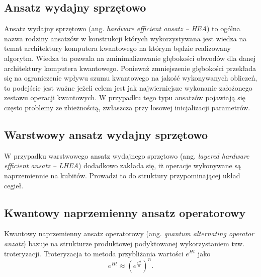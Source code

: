 \documentclass[a4paper,11pt]{article}
\newcommand{\ang}[1]{(ang. \emph{#1})}
\begin{document}
\subsection{Ansatz wydajny sprzętowo}

Ansatz wydajny sprzętowo \ang{hardware efficient ansatz -- HEA} to ogólna nazwa rodziny ansatzów w konstrukcji których wykorzystywana jest wiedza na temat architektury komputera kwantowego na którym będzie realizowany algorytm. Wiedza ta pozwala na zminimalizowanie głębokości obwodów dla danej architektury komputera kwantowego. Ponieważ zmniejszenie głębokości przekłada się na ograniczenie wpływu szumu kwantowego na jakość wykonywanych obliczeń, to podejście jest ważne jeżeli celem jest jak najwierniejsze wykonanie założonego zestawu operacji kwantowych. W przypadku tego typu ansatzów pojawiają się często problemy ze zbieżnością, zwłaszcza przy losowej inicjalizacji parametrów.

\subsection{Warstwowy ansatz wydajny sprzętowo}

W przypadku warstwowego ansatz wydajnego sprzętowo \ang{layered hardware efficient ansatz -- LHEA} dodadkowo zakłada się, iż operacje wykonywane są naprzemiennie na kubitów. Prowadzi to do struktury przypominającej układ cegieł.  

\subsection{Kwantowy naprzemienny ansatz operatorowy}

Kwantowy naprzemienny ansatz operatorowy \ang{quantum alternating operator anzatz} bazuje na strukturze produktowej podyktowanej wykorzystaniem tzw. troteryzacji. Troteryzacja to metoda przybliżania wartości $e^{Ht}$ jako
\begin{equation}
	e^{Ht} \approx \left(e^{\frac{Ht}{n}}\right)^n.
\end{equation}
\end{document}
